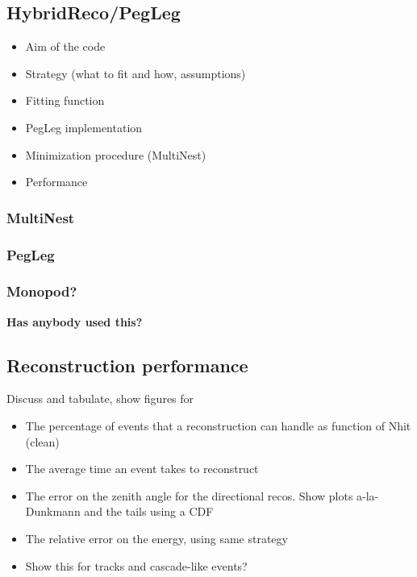 \documentclass[../Main.tex]{subfiles}
\begin{document}
\subsection{HybridReco/PegLeg}\label{sec:HybridReco}

\begin{itemize}
\item Aim of the code
\item Strategy (what to fit and how, assumptions)
\item Fitting function
\item PegLeg implementation
\item Minimization procedure (MultiNest)
\item Performance
\end{itemize}

\subsubsection{MultiNest}\label{sec:MultiNest}

\subsubsection{PegLeg}\label{sec:PegLeg}

\subsubsection{Monopod?}\label{sec:Monopod}

\textbf{Has anybody used this?}

\subsection{Reconstruction performance}\label{sec:reco_performance}

Discuss and tabulate, show figures for
\begin{itemize}
\item The percentage of events that a reconstruction can handle as function of Nhit (clean)
\item The average time an event takes to reconstruct
\item The error on the zenith angle for the directional recos. Show plots a-la-Dunkmann and the tails using a CDF
\item The relative error on the energy, using same strategy
\item Show this for tracks and cascade-like events?
\end{itemize}


\end{document}
